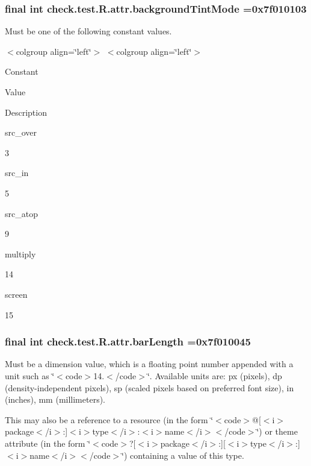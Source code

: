 \subsubsection[{background\+Tint\+Mode}]{\setlength{\rightskip}{0pt plus 5cm}final int check.\+test.\+R.\+attr.\+background\+Tint\+Mode =0x7f010103\hspace{0.3cm}{\ttfamily [static]}}\label{classcheck_1_1test_1_1_r_1_1attr_a30ef6484cfe3015f32395a912756a38f}
Must be one of the following constant values.

\begin{TabularC}{0}
\hline
\end{TabularC}
$<$colgroup align=\char`\"{}left\char`\"{}$>$ $<$colgroup align=\char`\"{}left\char`\"{}$>$ 

Constant

Value

Description 

{\ttfamily src\+\_\+over}

3

{\ttfamily src\+\_\+in}

5

{\ttfamily src\+\_\+atop}

9

{\ttfamily multiply}

14

{\ttfamily screen}

15\hypertarget{classcheck_1_1test_1_1_r_1_1attr_a8be14f238cbedd30588097110eb9dc82}{}
\subsubsection[{bar\+Length}]{\setlength{\rightskip}{0pt plus 5cm}final int check.\+test.\+R.\+attr.\+bar\+Length =0x7f010045\hspace{0.3cm}{\ttfamily [static]}}\label{classcheck_1_1test_1_1_r_1_1attr_a8be14f238cbedd30588097110eb9dc82}
Must be a dimension value, which is a floating point number appended with a unit such as \char`\"{}$<$code$>$14.\+5sp$<$/code$>$\char`\"{}. Available units are\+: px (pixels), dp (density-\/independent pixels), sp (scaled pixels based on preferred font size), in (inches), mm (millimeters). 

This may also be a reference to a resource (in the form \char`\"{}$<$code$>$@\mbox{[}$<$i$>$package$<$/i$>$\+:\mbox{]}$<$i$>$type$<$/i$>$\+:$<$i$>$name$<$/i$>$$<$/code$>$\char`\"{}) or theme attribute (in the form \char`\"{}$<$code$>$?\mbox{[}$<$i$>$package$<$/i$>$\+:\mbox{]}\mbox{[}$<$i$>$type$<$/i$>$\+:\mbox{]}$<$i$>$name$<$/i$>$$<$/code$>$\char`\"{}) containing a value of this type. \hypertarget{classcheck_1_1test_1_1_r_1_1attr_a9be1079997ebc31c25e478abff5ec982}{}
